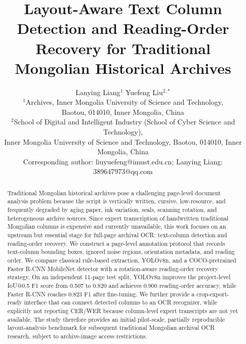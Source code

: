 \documentclass[12pt]{article}
\begin{document}
\title{Layout-Aware Text Column Detection and Reading-Order Recovery for Traditional Mongolian Historical Archives}

\author{\parbox{0.95\textwidth}{\centering Lanying Liang$^{1}$ \quad Yuefeng Liu$^{2,*}$\\[0.4em]\small $^{1}$Archives, Inner Mongolia University of Science and Technology,\\\small Baotou, 014010, Inner Mongolia, China\\\small $^{2}$School of Digital and Intelligent Industry (School of Cyber Science and Technology),\\\small Inner Mongolia University of Science and Technology, Baotou, 014010, Inner Mongolia, China\\\small *Corresponding author: liuyuefeng@imust.edu.cn; Lanying Liang: 389647973@qq.com}}
\date{}
\maketitle

\begin{abstract}
Traditional Mongolian historical archives pose a challenging page-level document analysis problem because the script is vertically written, cursive, low-resource, and frequently degraded by aging paper, ink variation, seals, scanning rotation, and heterogeneous archive sources. Since expert transcription of handwritten traditional Mongolian columns is expensive and currently unavailable, this work focuses on an upstream but essential stage for full-page archival OCR: text-column detection and reading-order recovery. We construct a page-level annotation protocol that records text-column bounding boxes, ignored noise regions, orientation metadata, and reading order. We compare classical rule-based extraction, YOLOv8n, and a COCO-pretrained Faster R-CNN MobileNet detector with a rotation-aware reading-order recovery strategy. On an independent 11-page test split, YOLOv8n improves the project-level IoU@0.5 F1 score from 0.507 to 0.820 and achieves 0.900 reading-order accuracy, while Faster R-CNN reaches 0.823 F1 after fine-tuning. We further provide a crop-export-ready interface that can connect detected columns to an OCR recognizer, while explicitly not reporting CER/WER because column-level expert transcripts are not yet available. The study therefore provides an initial pilot-scale, partially reproducible layout-analysis benchmark for subsequent traditional Mongolian archival OCR research, subject to archive-image access restrictions.
\end{abstract}
\end{document}
